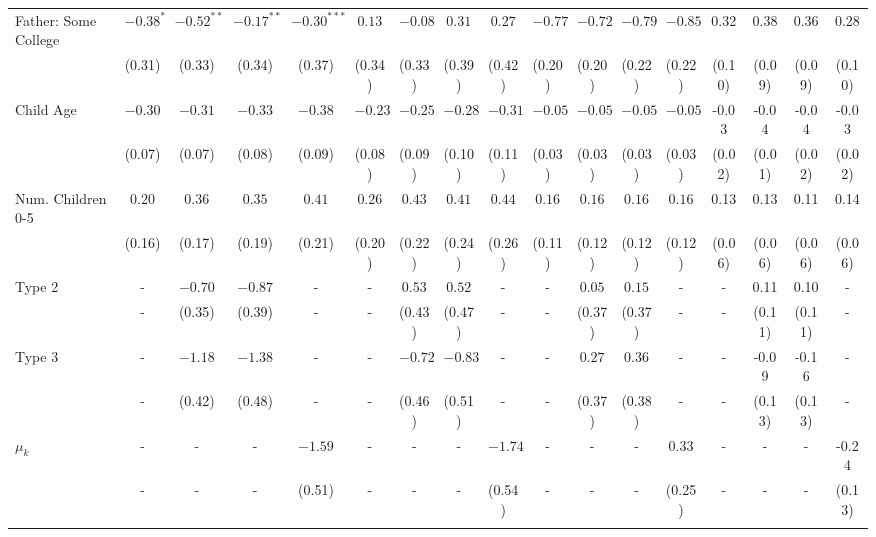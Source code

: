 \begin{tabular}{lcccccccccccccccc}
Father: Some College&$-0.38^{*}$&$-0.52^{**}$&$-0.17^{**}$&$-0.30^{***}$&$0.13$&$-0.08$&$0.31$&$0.27$&$-0.77$&$-0.72$&$-0.79$&$-0.85$&0.32&0.38&0.36&0.28\\
&(0.31)&(0.33)&(0.34)&(0.37)&(0.34)&(0.33)&(0.39)&(0.42)&(0.20)&(0.20)&(0.22)&(0.22)&(0.10)&(0.09)&(0.09)&(0.10)\\
Child Age&$-0.30$&$-0.31$&$-0.33$&$-0.38$&$-0.23$&$-0.25$&$-0.28$&$-0.31$&$-0.05$&$-0.05$&$-0.05$&$-0.05$&-0.03&-0.04&-0.04&-0.03\\
&(0.07)&(0.07)&(0.08)&(0.09)&(0.08)&(0.09)&(0.10)&(0.11)&(0.03)&(0.03)&(0.03)&(0.03)&(0.02)&(0.01)&(0.02)&(0.02)\\
Num. Children 0-5&$0.20$&$0.36$&$0.35$&$0.41$&$0.26$&$0.43$&$0.41$&$0.44$&$0.16$&$0.16$&$0.16$&$0.16$&0.13&0.13&0.11&0.14\\
&(0.16)&(0.17)&(0.19)&(0.21)&(0.20)&(0.22)&(0.24)&(0.26)&(0.11)&(0.12)&(0.12)&(0.12)&(0.06)&(0.06)&(0.06)&(0.06)\\
Type 2&-&$-0.70$&$-0.87$&-&-&$0.53$&$0.52$&-&-&$0.05$&$0.15$&-&-&0.11&0.10&-\\
&-&(0.35)&(0.39)&-&-&(0.43)&(0.47)&-&-&(0.37)&(0.37)&-&-&(0.11)&(0.11)&-\\
Type 3&-&$-1.18$&$-1.38$&-&-&$-0.72$&$-0.83$&-&-&$0.27$&$0.36$&-&-&-0.09&-0.16&-\\
&-&(0.42)&(0.48)&-&-&(0.46)&(0.51)&-&-&(0.37)&(0.38)&-&-&(0.13)&(0.13)&-\\
$\mu_{k}$&-&-&-&$-1.59$&-&-&-&$-1.74$&-&-&-&$0.33$&-&-&-&-0.24\\
&-&-&-&(0.51)&-&-&-&(0.54)&-&-&-&(0.25)&-&-&-&(0.13)\\
\\
\bottomrule\end{tabular}